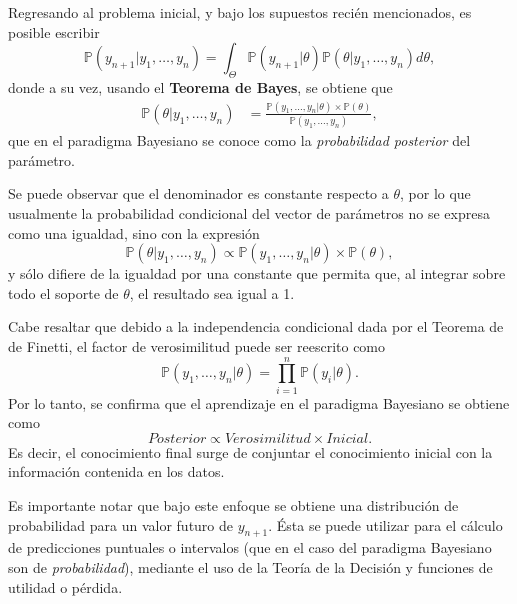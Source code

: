Regresando al problema inicial, y bajo los supuestos reci\'en mencionados, es posible escribir
\begin{equation*}
    \mathbb{P}(y_{n+1} | y_1,\ldots,y_n) =
    \int_{\Theta} 
    \mathbb{P}(y_{n+1}|\theta) \mathbb{P}(\theta|y_1,\ldots,y_n)d\theta,
\end{equation*}
donde a su vez, usando el \textbf{Teorema de Bayes}, se obtiene que
\begin{equation*}
\begin{aligned}
    \mathbb{P}(\theta|y_1,\ldots,y_n) &=
    \frac{\mathbb{P}(y_1,\ldots,y_n|\theta)\times\mathbb{P}(\theta)}
    {\mathbb{P}(y_1,\ldots,y_n)},
\end{aligned}
\end{equation*}
que en el paradigma Bayesiano se conoce como la \textit{probabilidad posterior} del par\'ametro. 

Se puede observar que el denominador es constante respecto a $\theta$, por lo que usualmente la probabilidad condicional del vector de par\'ametros no se expresa como una igualdad, sino con la expresi\'on
\begin{equation*}
    \mathbb{P}(\theta|y_1,\ldots,y_n) 
    \propto 
    \mathbb{P}(y_1,\ldots,y_n|\theta) \times \mathbb{P}(\theta),
\end{equation*}
y s\'olo difiere de la igualdad por una constante que permita que, al integrar sobre todo el soporte de $\theta$, el resultado sea igual a 1.

Cabe resaltar que debido a la independencia condicional dada por el Teorema de de Finetti, el factor de verosimilitud puede ser reescrito como
\begin{equation*}
    \mathbb{P}(y_1,\ldots,y_n|\theta)  = \prod_{i=1}^n \mathbb{P}(y_i|\theta).
\end{equation*}
Por lo tanto, se confirma que el aprendizaje en el paradigma Bayesiano se obtiene como
\begin{equation*}
    Posterior \propto Verosimilitud \times Inicial.
\end{equation*}
Es decir, el conocimiento final surge de conjuntar el conocimiento inicial con la informaci\'on contenida en los datos.

Es importante notar que bajo este enfoque se obtiene una distribuci\'on de probabilidad para un valor futuro de $y_{n+1}$. \'Esta se puede utilizar para el c\'alculo de predicciones puntuales o intervalos (que en el caso del paradigma Bayesiano son de \textit{probabilidad}), mediante el uso de la Teor\'ia de la Decisi\'on y funciones de utilidad o p\'erdida.

